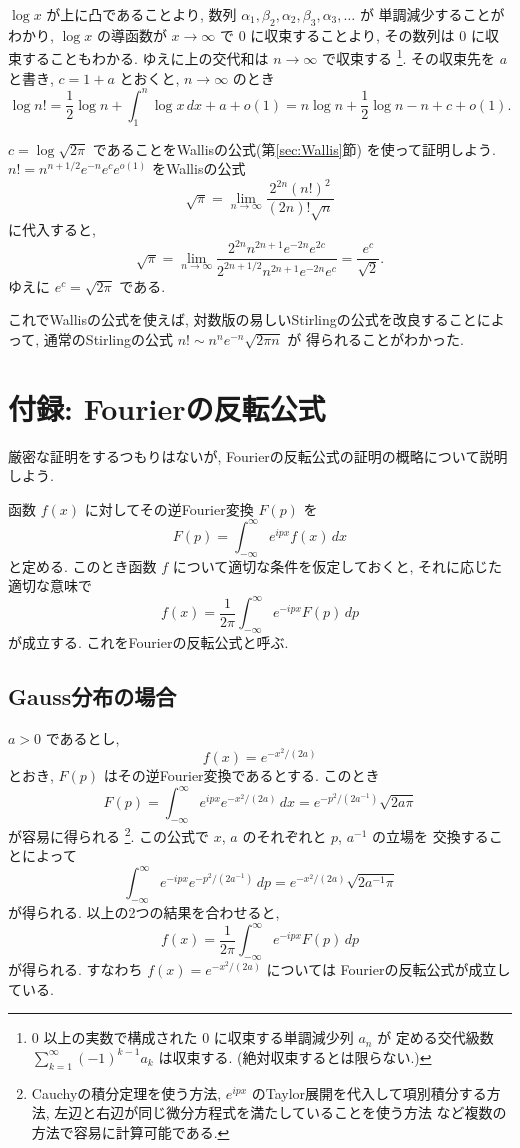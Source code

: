 \documentclass[12pt,twoside]{jarticle}
\theoremstyle{jplain}
\theoremstyle{jplain}
\theoremstyle{jplain}
\numberwithin{theorem}{section}
\numberwithin{equation}{section}
\numberwithin{figure}{section}
\numberwithin{table}{section}
\newcommand\secref[1]{第\ref{#1}節}
\begin{document}
$\log x$ が上に凸であることより, 
数列 $\alpha_1,\beta_2,\alpha_2,\beta_3,\alpha_3,\ldots$ が
単調減少することがわかり, 
$\log x$ の導函数が $x\to\infty$ で $0$ に収束することより, 
その数列は $0$ に収束することもわかる.
ゆえに上の交代和は $n\to\infty$ で収束する%
\footnote{$0$ 以上の実数で構成された $0$ に収束する単調減少列 $a_n$ が
定める交代級数 $\sum_{k=1}^\infty (-1)^{k-1}a_k$ は収束する.
(絶対収束するとは限らない.)}.
その収束先を $a$ と書き, $c=1+a$ とおくと, $n\to\infty$ のとき
\[
\log n!
= \frac{1}{2}\log n + \int_1^n\log x\,dx + a + o(1)
= n\log n +\frac{1}{2}\log n - n + c + o(1). 
\]

$c=\log\sqrt{2\pi}$ であることをWallisの公式(\secref{sec:Wallis})
を使って証明しよう. 
$n!=n^{n+1/2}e^{-n}e^ce^{o(1)}$ をWallisの公式
\[
\sqrt{\pi}=\lim_{n\to\infty}\frac{2^{2n}(n!)^2}{(2n)!\sqrt{n}}
\]
に代入すると,
\[
\sqrt{\pi}
=\lim_{n\to\infty}
\frac{2^{2n}n^{2n+1}e^{-2n}e^{2c}}{2^{2n+1/2}n^{2n+1}e^{-2n}e^c}
=\frac{e^c}{\sqrt{2}}.
\] 
ゆえに $e^c=\sqrt{2\pi}$ である.

これでWallisの公式を使えば, 
対数版の易しいStirlingの公式を改良することによって, 
通常のStirlingの公式 $n!\sim n^n e^{-n}\sqrt{2\pi n}$ が
得られることがわかった.


\section{付録: Fourierの反転公式}
\label{sec:Fourier}

厳密な証明をするつもりはないが, 
Fourierの反転公式の証明の概略について説明しよう.

函数 $f(x)$ に対してその逆Fourier変換 $F(p)$ を
\[
F(p) = \int_{-\infty}^\infty e^{ipx} f(x)\,dx
\]
と定める. このとき函数 $f$ について適切な条件を仮定しておくと, 
それに応じた適切な意味で
\[
f(x) = \frac{1}{2\pi}\int_{-\infty}^\infty e^{-ipx} F(p)\,dp
\]
が成立する. これをFourierの反転公式と呼ぶ.

\subsection{Gauss分布の場合}

$a>0$ であるとし, 
\[
f(x)=e^{-x^2/(2a)}
\]
とおき, $F(p)$ はその逆Fourier変換であるとする. このとき
\[
F(p)
=\int_{-\infty}^\infty e^{ipx} e^{-x^2/(2a)}\, dx
=e^{-p^2/(2a^{-1})}\sqrt{2a\pi}
\]
が容易に得られる%
\footnote{Cauchyの積分定理を使う方法, 
$e^{ipx}$ のTaylor展開を代入して項別積分する方法, 
左辺と右辺が同じ微分方程式を満たしていることを使う方法
など複数の方法で容易に計算可能である.}. %
この公式で $x$, $a$ のそれぞれと $p$, $a^{-1}$ の立場を
交換することによって 
\[
\int_{-\infty}^\infty e^{-ipx} e^{-p^2/(2a^{-1})}\, dp
=e^{-x^2/(2a)}\sqrt{2a^{-1}\pi}
\]
が得られる. 以上の2つの結果を合わせると, 
\[
 f(x) = \frac{1}{2\pi}\int_{-\infty}^\infty e^{-ipx} F(p)\,dp
\]
が得られる. すなわち $f(x)=e^{-x^2/(2a)}$ については
Fourierの反転公式が成立している.
\end{document}
